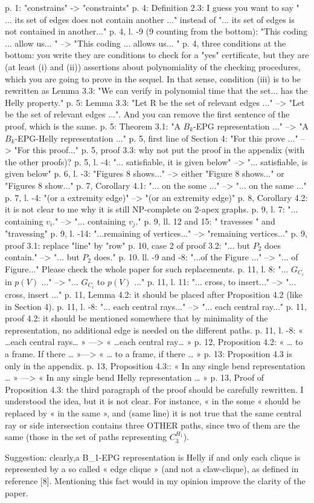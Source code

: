 p. 1: "constrains" -> "constraints"
p. 4: Definition 2.3: I guess you want to say " ... its set of edges does not contain another ..." instead of "... its set of edges is not contained in another..."
p. 4, l. -9 (9 counting from the bottom): "This coding ... allow us... " --> "This coding ... allows us... "
p. 4,  three conditions at the bottom: you write they are conditions to check for a "yes" certificate, but they are (at least (i) and (ii)) assertions about polynomiality of the checking procedures, which you are going to prove in the sequel. In that sense, condition (iii) is to be rewritten as Lemma 3.3: "We can verify in polynomial time that the set... has the Helly property."
p. 5: Lemma 3.3: "Let R be the set of relevant edges ..." --> "Let  be the set of relevant edges ...". And you can remove the first sentence of the proof, which is the same.
p. 5: Theorem 3.1: "A $B_k$-EPG representation ..." -->  "A $B_k$-EPG-Helly representation ..."
p. 5, first line of Section 4: "For this prove ..." --> "For this proof..."
p. 5, proof 3.3: why not put the proof in the appendix (with the other proofs)?
p. 5, l. -4: "... satisfiable, it is given below" --> "... satisfiable, is given below"
p. 6, l. -3: "Figures 8 shows..." -->  either "Figure 8 shows..."  or "Figures 8 show..."
p. 7, Corollary 4.1: "... on the some ..." --> "... on the same ..."
p. 7, l. -4: "(or a extremity edge)" --> "(or an extremity edge)"
p. 8, Corollary 4.2: it is not clear to me why it is still NP-complete on 2-apex graphs.
p. 9, l. 7: "... containing $v_i$." --> "... containing $v_j$."
p. 9, ll. 12 and 15: " travesses " and "travessing"
p. 9, l. -14: "...remaining of vertices..." --> "remaining vertices..."
p. 9, proof 3.1: replace "line" by "row"
p. 10, case 2 of proof 3.2: "... but $P_2$ does contain." --> "... but $P_2$ does."
p. 10. ll. -9 and -8: "...of the Figure ..." --> "... of Figure..." Please check the whole paper for such replacements.
p. 11, l. 8: "... $G_{C_i}$ in $p(V)$ ..." --> "... $G_{C_i}$ to $p(V)$ ..."
p. 11, l. 11: "... cross, to insert..." --> "... cross, insert ..."
p. 11, Lemma 4.2: it should be placed after Proposition 4.2 (like in Section 4).
p. 11, l. -8: "... each central rays..." --> "... each central ray..."
p. 11, proof 4.2: it should be mentioned somewhere that by minimality of the representation, no additional edge is needed on the different paths.
p. 11, l. -8: « …each central rays… » —> « …each central ray… »
p. 12, Proposition 4.2: « … to a frame. If there … »—> « … to a frame, if there … »
p. 13: Proposition 4.3 is only in the appendix.
p. 13, Proposition 4.3:: « In any single bend representation … » —> « In any single bend Helly representation … » 
p. 13, Proof of Proposition 4.3: the third paragraph of the proof should be carefully rewritten. I understood the idea, but it is not clear. For instance, « in the some « should be replaced  by « in the same », and (same line) it is not true that the same central ray or side intersection contains three OTHER paths, since two of them are the same (those in the set of paths representing $C_3^{H_1}$).

Suggestion: clearly,a B_1-EPG representation is Helly if and only each clique is represented by a so called « edge clique » (and not a claw-clique), as defined in reference [8]. Mentioning this fact would in my opinion improve the clarity of the paper.



